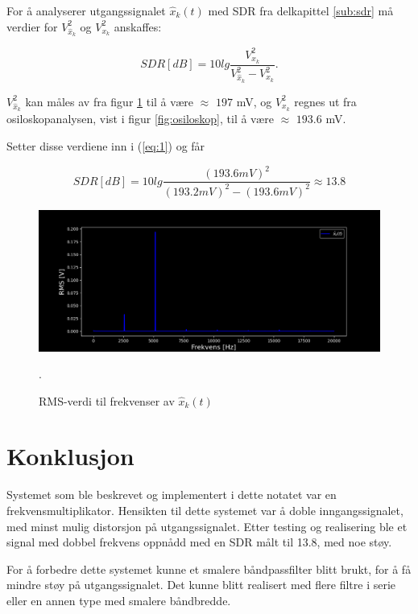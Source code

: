 \documentclass[a4paper,11pt,norsk]{article}
\begin{document}
For å analyserer utgangssignalet $\hat{x}_k(t)$ med SDR fra delkapittel \ref{sub:sdr} må verdier for $V^2_{\hat{x}_{k}}$ og $V^2_{x_{k}}$ anskaffes:

\begin{equation}
    SDR[dB] = 10lg\frac{V^2_{x_{k}}}{V^2_{\hat{x}_{k}}-V^2_{x_{k}}} .
    \label{eq:1}
\end{equation}

$V^2_{\hat{x}_{k}}$ kan måles av fra figur \ref{fig:spectrum2} til å være $\approx$ $197$ mV, og $V^2_{x_{k}}$ regnes ut fra osiloskopanalysen, vist i figur \ref{fig:osiloskop}, til å være $\approx$ $193.6$ mV.

Setter disse verdiene inn i (\ref{eq:1}) og får

\begin{equation*}
    SDR[dB] = 10lg\frac{(193.6mV)^2}{(193.2mV)^2-(193.6mV)^2} \approx 13.8
\end{equation*}

\begin{figure}[H]
  \centering
  \includegraphics[scale=0.442]{D1/Images/Spectrum3.png}
  \caption{RMS-verdi til frekvenser av  $\hat{x}_{k}(t)$}.
  \label{fig:spectrum2}
\end{figure}


\section{Konklusjon}
\label{sec:konklusjon}

Systemet som ble beskrevet og implementert i dette notatet var en frekvensmultiplikator. Hensikten til dette systemet var å doble inngangssignalet, med minst mulig distorsjon på utgangssignalet. 
Etter testing og realisering ble et signal med dobbel frekvens oppnådd med en SDR målt til 13.8, med noe støy.

For å forbedre dette systemet kunne et smalere båndpassfilter blitt brukt, for å få mindre støy på utgangssignalet. Det kunne blitt realisert med flere filtre i serie eller en annen type med smalere båndbredde.
\end{document}
